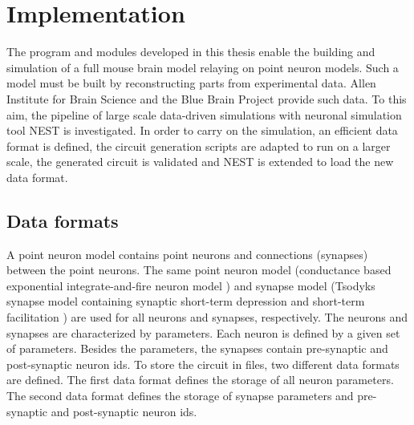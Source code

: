 %

\chapter{Implementation}

The program and modules developed in this thesis enable the building and simulation
of a full mouse brain model relaying on point neuron models. Such a model must be built by
reconstructing parts from experimental data.
Allen Institute for Brain Science and the Blue Brain Project provide such data.
To this aim, the pipeline of large scale data-driven simulations with neuronal simulation tool NEST is investigated.
In order to carry on the simulation, an efficient data format is defined, the circuit generation scripts are adapted to
run on a larger scale, the generated circuit is validated and NEST is extended to load the new data format.

\section{Data formats}
\label{sec:dataformats}
A point neuron model contains point neurons and connections (synapses) between the point neurons.
The same point neuron model (conductance based exponential integrate-and-fire neuron model \cite{brette2005adaptive}) and synapse model (Tsodyks synapse model containing synaptic short-term depression and short-term facilitation \cite{tsodyks1997neural, fuhrmann2002coding}) are used for all neurons and synapses, respectively.
The neurons and synapses are characterized by parameters.
Each neuron is defined by a given set of parameters.
Besides the parameters, the synapses contain pre-synaptic and post-synaptic neuron ids.
To store the circuit in files, two different data formats are defined.
The first data format defines the storage of all neuron parameters.
The second data format defines the storage of synapse parameters and pre-synaptic and post-synaptic neuron ids.


